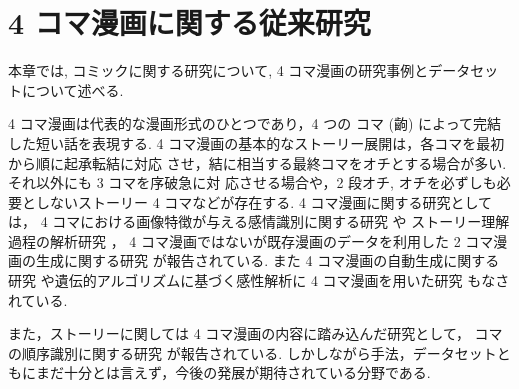 \newpage
\changeindent{0cm}
\section{4 コマ漫画に関する従来研究}
\changeindent{2cm}

本章では, コミックに関する研究について, 4 コマ漫画の研究事例とデータセットについて述べる.

4 コマ漫画は代表的な漫画形式のひとつであり，4 つの コマ (齣) によって完結した短い話を表現する.
4 コマ漫画の基本的なストーリー展開は，各コマを最初から順に起承転結に対応
させ，結に相当する最終コマをオチとする場合が多い. それ以外にも 3 コマを序破急に対
応させる場合や，2 段オチ, オチを必ずしも必要としないストーリー 4 コマなどが存在する.
4 コマ漫画に関する研究としては，
4 コマにおける画像特徴が与える感情識別に関する研究 \cite{ueno-emotion2016} や
ストーリー理解過程の解析研究 \cite{ueno-oti2017}，
4 コマ漫画ではないが既存漫画のデータを利用した
2 コマ漫画の生成に関する研究 \cite{jsai18mukaeyama} が報告されている.
また 4 コマ漫画の自動生成に関する研究 \cite{ueno:dcai2016}
や遺伝的アルゴリズムに基づく感性解析に
4 コマ漫画を用いた研究 \cite{GA4koma} もなされている.

また，ストーリーに関しては 4 コマ漫画の内容に踏み込んだ研究として，
コマの順序識別に関する研究 \cite{ueno2016estimation,jsai18fujino} が報告されている.
しかしながら手法，データセットともにまだ十分とは言えず，今後の発展が期待されている分野である.
